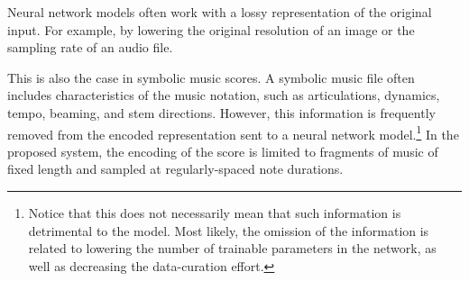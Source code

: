 
Neural network models often work with a lossy representation
of the original input. For example, by lowering the original
resolution of an image or the sampling rate of an audio
file.

This is also the case in symbolic music scores. A symbolic
music file often includes characteristics of the music
notation, such as articulations, dynamics, tempo, beaming,
and stem directions. However, this information is frequently
removed from the encoded representation sent to a neural
network model.\footnote{Notice that this does not
necessarily mean that such information is detrimental to the
model. Most likely, the omission of the information is
related to lowering the number of trainable parameters in
the network, as well as decreasing the data-curation
effort.} In the proposed system, the encoding of the score
is limited to fragments of music of fixed length and sampled
at regularly-spaced note durations.
